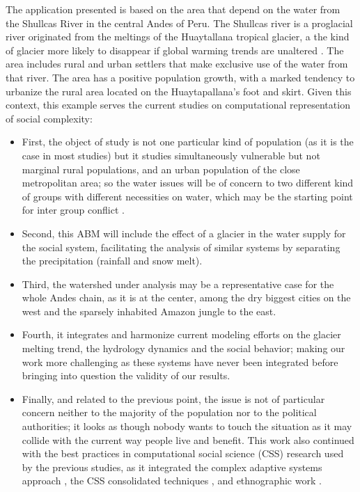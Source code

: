 \documentclass[doc,12pt,floatsintext]{apa7}
\begin{document}
The application presented is based on the area that depend on the water from the Shullcas River in the central Andes of Peru. The Shullcas river is a proglacial river originated from the meltings of the Huaytallana tropical glacier, a the kind of glacier more likely to disappear if global warming trends are unaltered \parencite{willige_explainer_2023}. The area includes rural and urban settlers that make exclusive use of the water from that river. The area has a positive population growth, with a marked tendency to urbanize the rural area located on the Huaytapallana's foot and skirt. Given this context, this example serves the current studies on computational representation of social complexity: 

\begin{itemize}
\item First, the object of study is not one particular kind of population (as it is the case in most studies) but it studies simultaneously vulnerable but not marginal rural populations, and an urban population of the close metropolitan area; so the water issues will be of concern to two different kind of groups with different necessities on water, which may be the starting point for inter group conflict \parencite{bar-tal_intergroup_2011}. 
\item Second, this ABM will include the effect of a glacier in the water supply for the social system, facilitating the analysis of similar systems by separating the precipitation (rainfall and snow melt). 
\item Third, the watershed under analysis may be a representative case for the whole Andes chain, as it is at the center, among the dry biggest cities on the west and the sparsely inhabited Amazon jungle to the east. 
\item Fourth, it integrates and harmonize current modeling efforts on the glacier melting trend, the hydrology dynamics and the social behavior; making our work more challenging as these systems have never been integrated before bringing into question the validity of our results. 
\item Finally, and related to the previous point, the issue is not of particular concern neither to the majority of the population nor to the political authorities; it looks as though nobody wants to touch the situation as it may collide with the current way people live and benefit. This work also continued with the best practices in computational social science (CSS) research used by the previous studies, as it  integrated the complex adaptive systems approach \parencite{miller_complex_2007}, the CSS consolidated techniques \parencite{cioffi-revilla_introduction_2014}, and ethnographic work \parencite{crate_anthropology_2009}.
\end{itemize}
\end{document}
